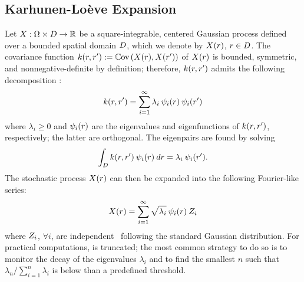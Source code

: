 \subsection{Karhunen-Lo\`{e}ve Expansion}
Let $X: \Omega \times D \to \mathbb{R}$ be a square-integrable, centered Gaussian process defined over a bounded spatial domain $D$, which we denote by $X(r)$, $r \in D$. The covariance function $\fCov{\r, \r'} := \Cov{X(\r), X(\r')}$ of $X(r)$ is bounded, symmetric, and nonnegative-definite by definition; therefore, $\fCov{\r, \r'}$ admits the following decomposition \cite{maitre2010}:
\[
  \fCov{\r, \r'} = \sum_{i = 1}^\infty \lambda_i \: \klb_i(\r) \: \klb_i(\r')
\]
where $\lambda_i \geq 0$ and $\psi_i(r)$ are the eigenvalues and eigenfunctions of $\fCov{\r, \r'}$, respectively; the latter are orthogonal. The eigenpairs are found by solving
\begin{equation} \elabel{kl-eigenpairs}
  \int_\domain \fCov{\r, \r'} \: \klb_i (\r) \: \d\r = \lambda_i \: \klb_i(\r').
\end{equation}
The stochastic process $X(r)$ can then be expanded into the following Fourier-like series:
\begin{equation} \elabel{kl-expansion}
  X(\r) = \sum_{i = 1}^\infty \sqrt{\lambda_i} \: \klb_i(\r) \: \Z_i
\end{equation}
where $Z_i$, $\forall i$, are independent \rvs\ following the standard Gaussian distribution. For practical computations,  is truncated; the most common strategy to do so is to monitor the decay of the eigenvalues $\lambda_i$ and to find the smallest $n$ such that $\lambda_n / \sum_{i = 1}^n \lambda_i$ is below than a predefined threshold.
